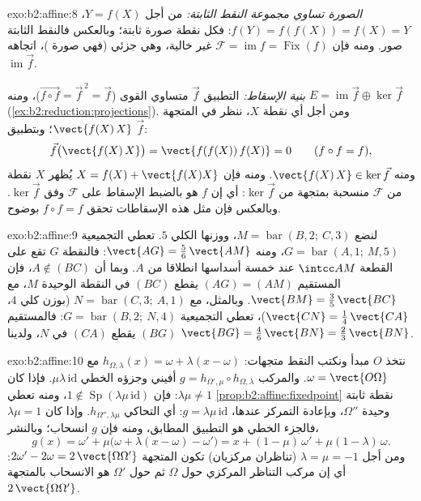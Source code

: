 \begin{solution}{exo:b2:affine:8}
\emph{الصورة تساوي مجموعة النقط الثابتة:} من أجل $Y = f(X)$، $f(Y) = f(f(X)) =
f(X) = Y$:
فكل نقطة صورة ثابتة؛ وبالعكس فالنقط الثابتة صور. ومنه فإن $\mathcal{F} = \operatorname{im} f =
\operatorname{Fix}(f)$ غير
خالية، وهي  جزئي (فهي صورة )، اتجاهه $\operatorname{im}\vec f$.

\emph{بنية الإسقاط:} التطبيق $\vec f$ متساوي القوى ($\vec{f\circ
f} = \vec f^{\,2} = \vec f$)، ومنه
$E = \operatorname{im}\vec f
\oplus \ker \vec f$ (\cref{ex:b2:reduction:projections}). ومن أجل أي نقطة $X$، ننظر في المتجهة $\vect{f(X)\,X}$؛
وبتطبيق $\vec f$:
\[
\vec f\bigl(\vect{f(X)\,X}\bigr) = \vect{f(f(X))\,f(X)} = 0
\qquad (f \circ f = f),
\]
ومنه $\vect{f(X)\,X} \in \ker\vec f$. ومنه فإن $X = f(X) +
\vect{f(X)X}$ يُظهر $X$ نقطة من $\mathcal{F}$ منسحبة
بمتجهة من $\ker\vec f$: أي إن $f$ هو بالضبط الإسقاط على $\mathcal{F}$ وفق
$\ker\vec f$. وبالعكس فإن مثل هذه الإسقاطات تحقق $f \circ f = f$ بوضوح.
\end{solution}

\begin{solution}{exo:b2:affine:9}
لنضع $M = \operatorname{bar}(B, 2;\ C, 3)$، ووزنها الكلي $5$.
تعطي التجميعية $G = \operatorname{bar}(A, 1;\ M, 5)$، ومنه $\vect{AG} = \frac56\,\vect{AM}$: فالنقطة $G$ تقع على القطعة
$\intcc AM$ عند خمسة أسداسها انطلاقا من $A$. وبما أن $A \notin
(BC)$، فإن
المستقيم $(AG) = (AM)$ يقطع $(BC)$ في النقطة الوحيدة $M$، مع $\vect{BM} = \frac35\,\vect{BC}$.
وبالمثل، مع $N =
\operatorname{bar}(C, 3;\ A, 1)$ (بوزن كلي $4$، $\vect{CN}
= \frac14\,\vect{CA}$)، تعطي التجميعية
$G =
\operatorname{bar}(B, 2;\ N, 4)$: فالمستقيم $(BG)$ يقطع $(CA)$ في $N$، ولدينا $\vect{BG} = \frac46\,\vect{BN} =
\frac23\,\vect{BN}$.
\end{solution}

\begin{solution}{exo:b2:affine:10}
نتخذ $O$ مبدأ ونكتب النقط متجهات: $h_{\Omega, \lambda}(x) = \omega + \lambda(x - \omega)$ مع $\omega = \vect{O\Omega}$. والمركب
$g = h_{\Omega',
\mu} \circ h_{\Omega, \lambda}$ أفيني وجزؤه الخطي $\mu\lambda\,\mathrm{id}$. فإذا كان $\lambda\mu \neq 1$: فإن $1 \notin
\operatorname{Sp}(\lambda\mu\,\mathrm{id})$، ومنه
تعطي \cref{prop:b2:affine:fixedpoint} نقطة ثابتة وحيدة $\Omega''$، وبإعادة التمركز عندها، $g =
\lambda\mu\,\mathrm{id}$: أي
التحاكي $h_{\Omega'',
\lambda\mu}$. وإذا كان $\lambda\mu = 1$ فالجزء الخطي هو التطبيق المطابق،
ومنه فإن $g$ انسحاب؛ وبالنشر،
\[
g(x) = \omega' + \mu\bigl(\omega + \lambda(x - \omega) -
\omega'\bigr) = x + (1 - \mu)\,\omega' + \mu(1 -
\lambda)\,\omega .
\]
ومن أجل $\lambda = \mu = -1$ (تناظران مركزيان) تكون المتجهة $2\omega' - 2\omega = 2\,\vect{\Omega\Omega'}$: أي إن مركب
التناظر المركزي حول $\Omega$ ثم حول $\Omega'$ هو الانسحاب بالمتجهة $2\,\vect{\Omega\Omega'}$.
\end{solution}

